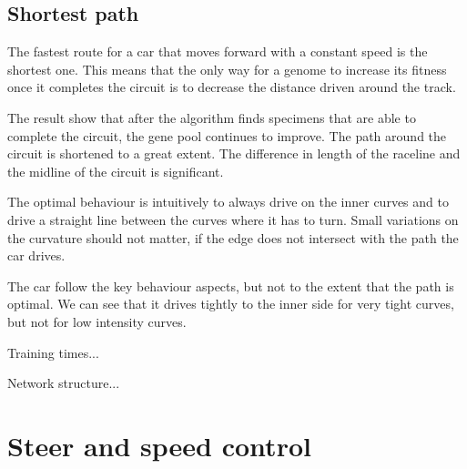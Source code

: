 \subsection{Shortest path}

The fastest route for a car that moves forward with a constant speed is the shortest one. This means that the only way for a genome to increase its fitness once it completes the circuit is to decrease the distance driven around the track.  

The result show that after the algorithm finds specimens that are able to complete the circuit, the gene pool continues to improve. The path around the circuit is shortened to a great extent. The difference in length of the raceline and the midline of the circuit is significant. 

The optimal behaviour is intuitively to always drive on the inner curves and to drive a straight line between the curves where it has to turn. Small variations on the curvature should not matter, if the edge does not intersect with the path the car drives.

The car follow the key behaviour aspects, but not to the extent that the path is optimal. We can see that it drives tightly to the inner side for very tight curves, but not for low intensity curves.

Training times...

Network structure...



\section{Steer and speed control}



%

